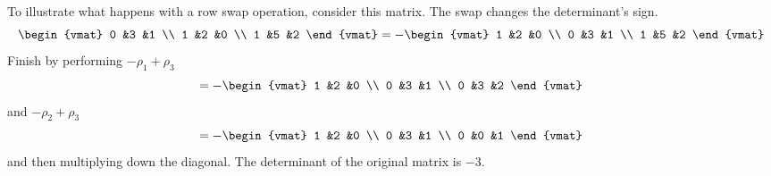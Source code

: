 \documentclass[10pt,t]{beamer}
\begin{document}
\begin{frame}
\ex
To illustrate what happens with a row swap operation,
consider this matrix. 
The swap changes the determinant's sign.
\begin{equation*}
  \begin{vmat}
    0  &3  &1 \\
    1  &2  &0 \\
    1  &5  &2
  \end{vmat}
  =
  -\begin{vmat}
    1  &2  &0 \\
    0  &3  &1 \\
    1  &5  &2
  \end{vmat}
\end{equation*}
Finish by performing $-\rho_1+\rho_3$
\begin{equation*}
  =-\begin{vmat}
    1  &2  &0 \\
    0  &3  &1 \\
    0  &3  &2
  \end{vmat}
\end{equation*}
and $-\rho_2+\rho_3$
\begin{equation*}
  =-\begin{vmat}
    1  &2  &0 \\
    0  &3  &1 \\
    0  &0  &1
  \end{vmat}
\end{equation*}
and then multiplying down the diagonal.
The determinant of the original matrix is $-3$.
\end{frame}
\end{document}
